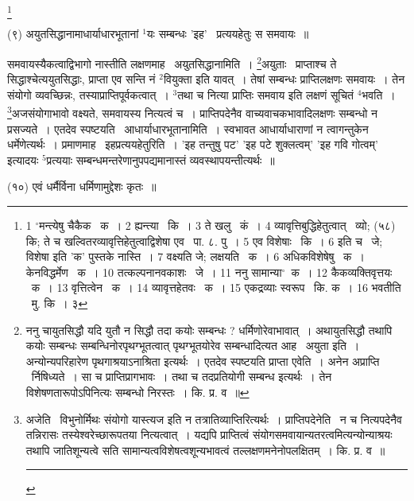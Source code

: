 \documentclass[11pt, openany]{book}
\newcommand\blfootnote[1]{%
 \begingroup
 \renewcommand\thefootnote{}\footnote{#1}%
 \addtocounter{footnote}{-1}%
 \endgroup
}
\begin{document}
\blfootnote{1 ${}^\circ$मन्त्येषु चैकैक  \textendash\ क~। 2 ह्यन्त्या  \textendash\ कि~। 3 ते खलु  \textendash\ कं~। 4 व्यावृत्तिबुद्धिहेतुत्वात्  \textendash\ व्यो; (५८) कि; ते च खल्वितरव्यावृत्तिहेतुत्वाद्विशेषा एव  \textendash\ पा. ८. पु~। 5 एव विशेषाः  \textendash\ कि~। 6 इति च  \textendash\ जे; विशेषा इति 'क' पुस्तके नास्ति~। 7 वक्ष्यति जे; लक्षयति \textendash\ क~। 6 अधिकविशेषेषु  \textendash\ क~। केनविद्धर्मेण  \textendash\ क~। 10 तत्कल्पनानवकाशः  \textendash\ जे~। 11 ननु सामान्या$^\circ$\textendash\ क~। 12 कैकव्यक्तिवृत्तयः  \textendash\ क~। 13 वृत्तित्वेन  \textendash\ क~। 14 व्यावृत्तहेतवः \textendash\ क~। 15 एकद्रव्याः स्वरूप  \textendash\ कि. क~। 16 भवतीति  \textendash\ मु. कि~। ३}

\newpage
\hangindent=2cm {\knu (९) अयुतसिद्धानामाधार्याधारभूतानां ${}^1$यः सम्बन्धः 'इह' \textendash\ प्रत्ययहेतुः स समवायः~॥}

समवायस्यैकत्वाद्विभागो नास्तीति लक्षणमाह \textendash\ {\knu अयुतसिद्धाना}मिति~। \renewcommand{\thefootnote}{१}\footnote{ननु चायुतसिद्धौ यदि युतौ न सिद्धौ तदा कयोः सम्बन्धः ? धर्मिणोरेवाभावात्~। अथायुतसिद्धौ तथापि कयोः सम्बन्धः सम्बन्धिनोरपृथग्भूतत्वात् पृथग्भूतयोरेव सम्बन्धादित्यत आह \textendash\ अयुता इति~। अन्योन्यपरिहारेण पृथगाश्रयाऽनाश्रिता इत्यर्थः~। एतदेव स्पष्टयति प्राप्ता एवेति~। अनेन अप्राप्ति \textendash\ र्निषिध्यते~। सा च प्राप्तिप्रागभावः~। तथा च तदप्रतियोगी सम्बन्ध इत्यर्थः~। तेन विशेषणतारूपोऽपिनित्यः सम्बन्धो निरस्तः~। कि. प्र. व~॥}अयुताः \textendash\ प्राप्ताश्च ते सिद्धाश्चेत्ययुतसिद्धाः, प्राप्ता एव सन्ति नं ${}^2$वियुक्ता इति यावत्~। तेषां सम्बन्धः प्राप्तिलक्षणः समवायः~। तेन संयोगो व्यवच्छिन्नः, तस्याप्राप्तिपूर्वकत्वात्~। ${}^3$तथा च नित्या प्राप्तिः समवाय इति लक्षणं सूचितं ${}^4$भवति~। \renewcommand{\thefootnote}{२}\footnote{अजेति \textendash\ विभुनोर्मिथः संयोगो यास्त्यज इति न तत्रातिव्याप्तिरित्यर्थः~। प्राप्तिपदेनेति  \textendash\ न च नित्यपदेनैव तन्निरासः तस्येश्वरेच्छारूपतया नित्यत्वात्~। यद्यपि प्राप्तित्वं संयोगसमवायान्यतरत्वमित्यन्योन्याश्रयः तथापि जातिशून्यत्वे सति सामान्यत्वविशेषत्वशून्यभावत्वं तल्लक्षणमनेनोपलक्षितम्~। कि. प्र. व~॥ \rule{0.4\linewidth}{0.5pt}}अजसंयोगाभावो वक्ष्यते, समवायस्य नित्यत्वं च~। प्राप्तिपदेनैव वाच्यवाचकभावादिलक्षणः सम्बन्धो न प्रसज्यते~। एतदेव स्पष्टयति \textendash\ {\knu आधार्याधारभूताना}मिति~। स्वभावत आधार्याधाराणां न त्वागन्तुकेन धर्मेणेत्यर्थः~। प्रमाणमाह \textendash\ {\knu इहप्रत्ययहेतु}रिति~। 'इह तन्तुषु पट' 'इह पटे शुक्लत्वम्' 'इह गवि गोत्वम्' इत्यादयः ${}^5$प्रत्ययाः सम्बन्धमन्तरेणानुपपद्यमानास्तं व्यवस्थापयन्तीत्यर्थः~॥

{\knu (१०) एवं धर्मैर्विना धर्मिणामुद्देशः कृतः~॥}
\end{document}
